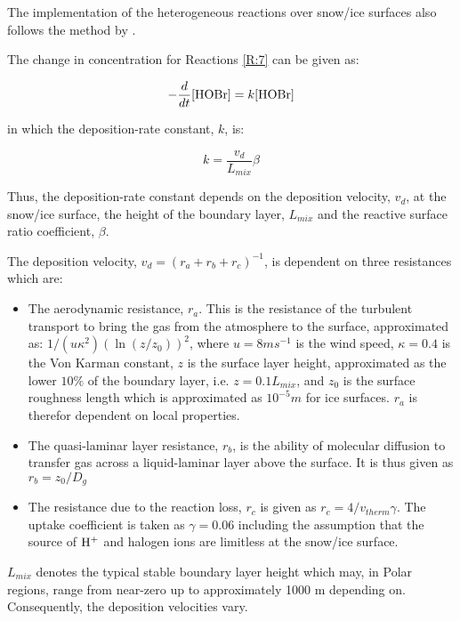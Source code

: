 The implementation of the heterogeneous reactions over snow/ice surfaces also follows the method by \cite{CAO}. 

\medskip

The change in concentration for Reactions \ref{R:7} can be given as: 

\begin{equation*}
    -\frac{d}{dt}[\mathrm{HOBr}] = k[\mathrm{HOBr}]
\end{equation*}

in which the deposition-rate constant, $k$, is: 

\begin{equation*}
    k = \frac{v_d}{L_{mix}}\beta
\end{equation*}

Thus, the deposition-rate constant depends on the deposition velocity, $v_d$, at the snow/ice surface, the height of the boundary layer, $L_{mix}$ and the reactive surface ratio coefficient, $\beta$. 

\medskip

The deposition velocity, $v_d = (r_a + r_b + r_c)^{-1}$, is dependent on three resistances which are: 

\begin{itemize}
    \item The aerodynamic resistance, $r_a$. This is the resistance of the turbulent transport to bring the gas from the atmosphere to the surface, approximated as: $1/(u\kappa^2)(\ln(z/z_0))^2$, where $u = 8 ms^{-1}$ is the wind speed, $\kappa = 0.4$ is the Von Karman constant, $z$ is the surface layer height, approximated as the lower $10\%$ of the boundary layer, i.e. $z = 0.1L_{mix}$, and $z_0$ is the surface roughness length which is approximated as $10^{-5} m$ for ice surfaces. $r_a$ is therefor dependent on local properties. 
    \item The quasi-laminar layer resistance, $r_b$, is the ability of molecular diffusion to transfer gas across a liquid-laminar layer above the surface. It is thus given as $r_b = z_0/D_g$
    \item The resistance due to the reaction loss, $r_c$ is given as $r_c = 4/v_{therm}\gamma$. The uptake coefficient is taken as $\gamma = 0.06$ including the assumption that the source of $\mathrm{H^+}$ and halogen ions are limitless at the snow/ice surface. 
\end{itemize}

$L_{mix}$ denotes the typical stable boundary layer height which may, in Polar regions, range from near-zero up to approximately 1000 m depending on. Consequently, the deposition velocities vary.

